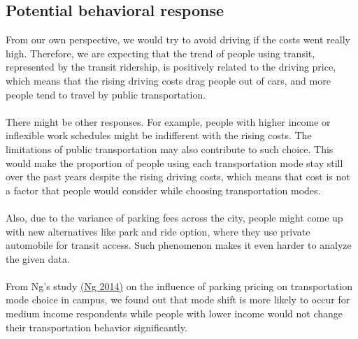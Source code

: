 \documentclass[12pt]{article}
\begin{document}
\subsection{Potential behavioral response}
From our own perspective, we would try to avoid driving if the costs went really high. Therefore, we are expecting that the trend of people using transit, represented by the transit ridership, is positively related to the driving price, which means that the rising driving costs drag people out of cars, and more people tend to travel by public transportation.\\\\ 
There might be other responses. For example, people with higher income or inflexible work schedules might be indifferent with the rising costs. The limitations of public transportation may also contribute to such choice. This would make the proportion of people using each transportation mode stay still over the past years despite the rising driving costs, which means that cost is not a factor that people would consider while choosing transportation modes.\\\\
Also, due to the variance of parking fees across the city, people might come up with new alternatives like park and ride option, where they use private automobile for transit access. Such phenomenon makes it even harder to analyze the given data.\\\\
From Ng's study \hyperref[ref:Ng]{(Ng 2014)} on the influence of parking pricing on transportation mode choice in campus, we found out that mode shift is more likely to occur for medium income respondents while people with lower income would not change their transportation behavior significantly.
\end{document}
